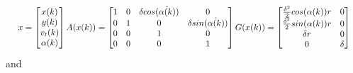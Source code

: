 \documentclass[twocolumn]{article}
\begin{document}
\begin{equation*}
    \resizebox{.99\columnwidth}{!}{ $ x=\begin{bmatrix} x(k) \\ y(k) \\ v_{t}(k) \\ \alpha(k) \\ \end{bmatrix}
            A(x(k))=\begin{bmatrix}
                1 & 0 & \delta cos(\dot{\alpha (k)}) & 0                            \\
                0 & 1 & 0                            & \delta sin(\dot{\alpha (k)}) \\
                0 & 0 & 1                            & 0                            \\
                0 & 0 & 0                            & 1                            \\
            \end{bmatrix}
            G(x(k))=\begin{bmatrix}
                \frac{\delta^{2}}{2} cos(\alpha (k))r & 0      \\
                \frac{\delta^{2}}{2} sin(\alpha (k))r & 0      \\
                \delta r                              & 0      \\
                0                                     & \delta \\
            \end{bmatrix}
        $ } \end{equation*}
and
\end{document}
